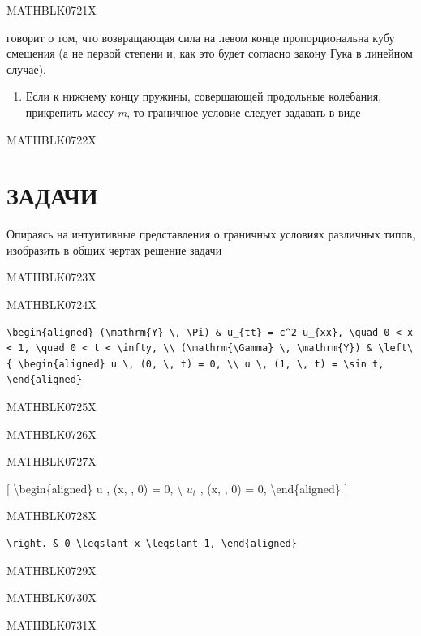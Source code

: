 \documentclass[
]{article}
\providecommand{\tightlist}{%
  \setlength{\itemsep}{0pt}\setlength{\parskip}{0pt}}
\begin{document}
{{MATHBLK0721X

говорит о том, что возвращающая сила на левом конце пропорциональна кубу
смещения (а не первой степени и, как это будет согласно закону Гука в
линейном случае).

\begin{enumerate}
\def\labelenumi{\arabic{enumi}.}
\setcounter{enumi}{2}
\tightlist
\item
  Если к нижнему концу пружины, совершающей продольные колебания,
  прикрепить массу \emph{m}, то граничное условие следует задавать в
  виде
\end{enumerate}

MATHBLK0722X

\section{ЗАДАЧИ}\label{ux437ux430ux434ux430ux447ux438-4}

Опираясь на интуитивные представления о граничных условиях различных
типов, изобразить в общих чертах решение задачи

MATHBLK0723X

MATHBLK0724X

\begin{verbatim}
\begin{aligned} (\mathrm{Y} \, \Pi) & u_{tt} = c^2 u_{xx}, \quad 0 < x < 1, \quad 0 < t < \infty, \\ (\mathrm{\Gamma} \, \mathrm{Y}) & \left\{ \begin{aligned} u \, (0, \, t) = 0, \\ u \, (1, \, t) = \sin t, \end{aligned}
\end{verbatim}

MATHBLK0725X

MATHBLK0726X

MATHBLK0727X

{[} \textbackslash begin\{aligned\} u , (x, , 0) = 0, \textbackslash{}
\(u_{t}\) , (x, , 0) = 0, \textbackslash end\{aligned\} {]}

MATHBLK0728X

\begin{verbatim}
\right. & 0 \leqslant x \leqslant 1, \end{aligned}
\end{verbatim}

MATHBLK0729X

MATHBLK0730X

MATHBLK0731X

}}
\end{document}

